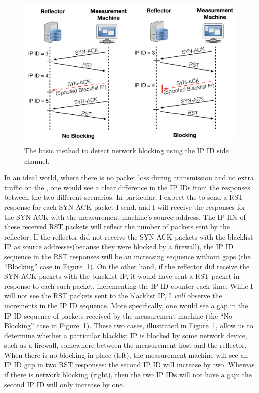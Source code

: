 
\begin{figure}[t]
    \centering
    \includegraphics[width=0.98\columnwidth]{data_usage/images/cropped_method_protocol_v2.pdf}
    \caption{The basic method to detect network blocking using the IP ID side channel.}
    \label{fig:coreidea}
\end{figure}

In an ideal world, where there is no packet loss during transmission
and no extra traffic on the {}, one would see a clear difference
in the IP IDs from the responses between the two different scenarios.
In particular, I expect the {} to send a RST response for
each SYN-ACK packet I send, and I will receive the responses for
the SYN-ACK with the measurement machine's source address. The IP IDs of 
these received RST packets will reflect the number of packets sent by the
reflector. If the reflector did not receive the SYN-ACK packets with the
blacklist IP as source addresses(because they were blocked by a
firewall), the IP ID sequence in the RST responses will be an
increasing sequence without gaps (the ``Blocking'' case in Figure~\ref{fig:coreidea}).
On the other hand, if the reflector did
receive the SYN-ACK packets with the blacklist IP, it would have sent
a RST packet in response to each such packet, incrementing the IP ID counter
each time. While I will not see the RST packets sent to the blacklist
IP, I \emph{will} observe the increments in the IP ID sequence.
More specifically, one would see a gap in the IP ID sequence of packets
received by the measurement machine (the ``No Blocking'' case in
Figure~\ref{fig:coreidea}).
These two cases, illustrated in Figure~\ref{fig:coreidea}, allow us to
determine whether a particular blacklist IP is blocked by some network
device, such as a firewall, somewhere between the measurement host and
the reflector. When there is no blocking in place (left), the measurement
machine will see an IP ID gap in two RST responses: the second IP ID will
increase by two. Whereas if there is network blocking (right), then the
two IP IDs will not have a gap: the second IP ID will only increase by
one.

